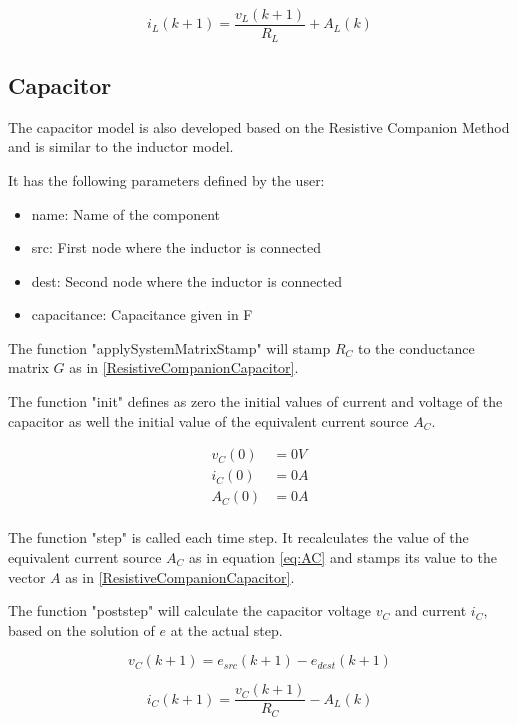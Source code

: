\begin{equation} \label{eq:inductorCurrent}
i_L(k+1) = \frac{v_L(k+1)}{R_L} + A_L(k)
\end{equation}
 

\subsection{Capacitor}

The capacitor model is also developed based on the Resistive Companion Method and is similar to the inductor model.

It has the following parameters defined by the user:

\begin{itemize}
\item name: Name of the component
\item src: First node where the inductor is connected
\item dest: Second node where the inductor is connected
\item capacitance: Capacitance given in F
\end{itemize}

The function "applySystemMatrixStamp" will stamp $R_C$ to the conductance matrix $G$ as in \ref{ResistiveCompanionCapacitor}.

The function "init" defines as zero the initial values of current and voltage of the capacitor as well the initial value of the equivalent current source $A_C$.

\begin{align*}
v_C(0)&=0V \\
i_C(0)&=0A \\
A_C(0)&=0A \\
\end{align*}

The function "step" is called each time step. It recalculates the value of the equivalent current source $A_C$ as in equation \ref{eq:AC} and stamps its value to the vector $A$ as in \ref{ResistiveCompanionCapacitor}.

The function "poststep" will calculate the capacitor voltage $v_C$ and current $i_C$, based on the solution of $e$ at the actual step.

\begin{equation}
v_C(k+1) = e_{src}(k+1) - e_{dest}(k+1)
\end{equation}

\begin{equation}
i_C(k+1) = \frac{v_C(k+1)}{R_C} - A_L(k)
\end{equation}
 

